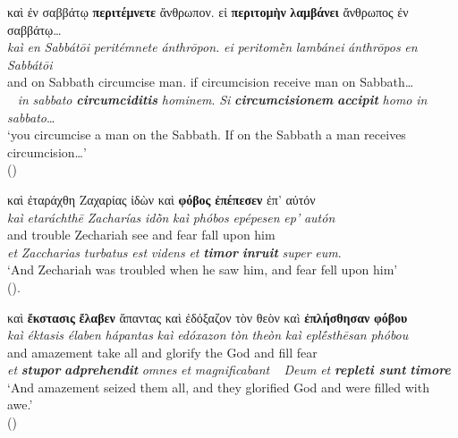 \documentclass[output=paper,colorlinks,citecolor=brown]{langscibook}
\begin{document}
\ea\label{ex:bj:3}

\ea\label{ex:bj:3a}

\gllll καὶ ἐν σαββάτῳ \textbf{περιτέμνετε} ἄνθρωπον. εἰ \textbf{περιτομὴν}
\textbf{λαμβάνει} ἄνθρωπος ἐν σαββάτῳ\ldots{}\\
 \textit{kaì} \textit{en} \textit{Sabbátōi} \textit{peritémnete} \textit{ánthrōpon.} \textit{ei} \textit{peritomḕn} \textit{lambánei} \textit{ánthrōpos} \textit{en} \textit{Sabbátōi}\\
and on Sabbath circumcise man. if circumcision receive man on Sabbath\ldots{}\\
~ \emph{in} \emph{sabbato} \textbf{\itshape circumciditis} \emph{hominem}. \emph{Si}
\textbf{\itshape circumcisionem} \textbf{\itshape accipit} \emph{homo} \emph{in} \emph{sabbato}\ldots{}\\
\glt `you circumcise a man on the Sabbath. If on the Sabbath a man receives circumcision\ldots' \\
\hspace*{\fill}()

\ex\label{ex:bj:3b}

\gllll καὶ ἐταράχθη Ζαχαρίας ἰδὼν καὶ \textbf{φόβος} \textbf{ἐπέπεσεν} ἐπ' αὐτόν\\
 \textit{kaì} \textit{etaráchthē} \textit{Zacharías} \textit{idṑn} \textit{kaì} \textit{phóbos} \textit{epépesen} \textit{ep'} \textit{autón}\\
and trouble Zechariah see and fear fall upon him\\
\emph{et} \emph{Zaccharias} {\emph{turbatus} \emph{est}} \emph{videns} \emph{et}
\textbf{\itshape timor} \textbf{\itshape inruit} \textit{super} \textit{eum}.\\
\glt `And Zechariah was troubled when he saw him, and fear fell upon him' \\
\hspace*{\fill}().

\ex\label{ex:bj:3c}

\gllll καὶ \textbf{ἔκστασις} \textbf{ἔλαβεν} ἅπαντας καὶ ἐδόξαζον τὸν θεὸν καì \textbf{ἐπλήσθησαν} \textbf{φόβου}\\
 \textit{kaì} \textit{éktasis} \textit{élaben} \textit{hápantas} \textit{kaì} \textit{edóxazon} \textit{tòn} \textit{theòn} \textit{kaì} \textit{eplḗsthēsan} \textit{phóbou}\\
and amazement take all and glorify the God and fill fear\\
\emph{et} \textbf{\itshape stupor} \textbf{\itshape adprehendit} \emph{omnes} \emph{et} \emph{magnificabant} ~  \emph{Deum} \emph{et} \textbf{\itshape {repleti} \textbf{\itshape
  sunt}} \textbf{\itshape timore}\\
\glt `And amazement seized them all, and they glorified God and were filled with awe.' \\
\hspace*{\fill}()
\end{document}
